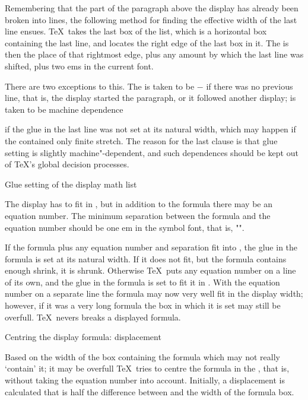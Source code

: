Remembering that the part of the paragraph above the display
has already been broken into lines, the following method
for finding the effective width of the last line ensues.
\TeX\ takes the last box of the list, which is a horizontal
box containing the last line, and locates the right edge
of the last box in it. The  is then
the place of that rightmost edge, plus any amount by which
the last line was shifted, plus two ems in the current font.

There are two exceptions to this. The 
is taken to be $-$ if there was no previous line,
that is,
the display started the paragraph, or it followed another display;
 is taken to be 
\term machine dependence\par
if the glue in the last line was not set at its natural width,
which may happen if the  contained only finite
stretch. The reason for the last clause is that glue
setting is slightly machine"-dependent, and such dependences
should be kept out of \TeX's global decision processes.

\point Glue setting of the display math list

The display has to fit in , 
but in addition to the formula there
may be an equation number. The minimum separation
between the formula and the equation number should
be one em in the symbol font, that is,
"".

If the formula plus any equation number
and separation fit into ,
the glue in the formula is set at its natural width. 
If it does not fit,
but the formula contains enough shrink, it is shrunk.
Otherwise \TeX\ puts any equation number
on a line of its own, and the glue in the formula is
set to fit it in .
With the equation
number on a separate line the formula may now very well fit in the
display width; however,
if it was a very long formula the box in which it is
set may still be overfull. \TeX\ nevers breaks a displayed
formula.

\point Centring the display formula: displacement

Based on the width of the box containing the formula \ldash which
may not really `contain' it; it may be overfull \rdash 
\TeX\ tries to centre the formula in the ,
that is, without taking the equation number into account.
Initially, a displacement is calculated that is 
half the difference between  and the
width of the formula box.

